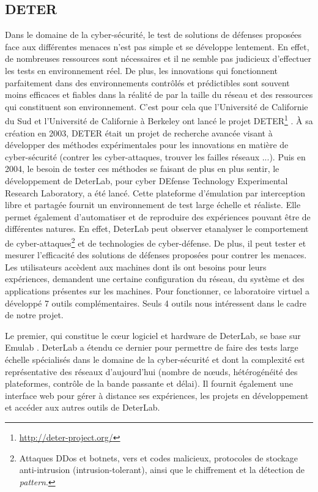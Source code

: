 \subsection{DETER}
\label{subsection:DETER}

Dans le domaine de la cyber-sécurité, le test de solutions de défenses proposées
face aux différentes menaces n'est pas simple et se développe lentement. En
effet, de nombreuses ressources sont nécessaires et il ne semble pas judicieux
d'effectuer les tests en environnement réel. De plus, les innovations qui
fonctionnent parfaitement dans des environnements contrôlés et prédictibles sont
souvent moins efficaces et fiables dans la réalité de par la taille du réseau et
des ressources qui constituent son environnement.  C'est pour cela que
l'Université de Californie du Sud et l'Université de Californie à Berkeley ont
lancé le projet DETER\footnote{\url{http://deter-project.org/}} \citep{DETER_benzel2011science,
  DETER_mirkovic2010deter}. À sa création en 2003, DETER était un projet de
recherche avancée visant à développer des méthodes expérimentales pour les
innovations en matière de cyber-sécurité (contrer les cyber-attaques, trouver
les failles réseaux ...). Puis en 2004, le besoin de tester ces méthodes se
faisant de plus en plus sentir, le développement de DeterLab, pour cyber DEfense
Technology Experimental Research Laboratory, a été lancé. Cette plateforme
d'émulation par interception libre et partagée fournit un environnement de test
large échelle et réaliste. Elle permet également d'automatiser et de reproduire
des expériences pouvant être de différentes natures. En effet, DeterLab peut
observer etanalyser le comportement de cyber-attaques\footnote{ Attaques DDos et
  botnets, vers et codes malicieux, protocoles de stockage anti-intrusion
  (intrusion-tolerant), ainsi que le chiffrement et la détection de
  \textit{pattern}.} et de technologies de cyber-défense. De plus, il peut
tester et mesurer l'efficacité des solutions de défenses proposées pour contrer
les menaces. Les utilisateurs accèdent aux machines dont ils ont besoins pour
leurs expériences, demandent une certaine configuration du réseau, du système et
des applications présentes sur les machines. Pour fonctionner, ce laboratoire
virtuel a développé 7 outils complémentaires. Seuls 4 outils nous intéressent
dans le cadre de notre projet.

Le premier, qui constitue le c\oe ur logiciel et hardware de DeterLab, se base
sur Emulab \citep{EMULAB_INIT}. DeterLab a étendu ce dernier pour permettre de
faire des tests large échelle spécialisés dans le domaine de la cyber-sécurité
et dont la complexité est représentative des réseaux d'aujourd'hui (nombre de
n\oe uds, hétérogénéité des plateformes, contrôle de la bande passante et
délai). Il fournit également une interface web pour gérer à distance ses
expériences, les projets en développement et accéder aux autres outils de
DeterLab.

